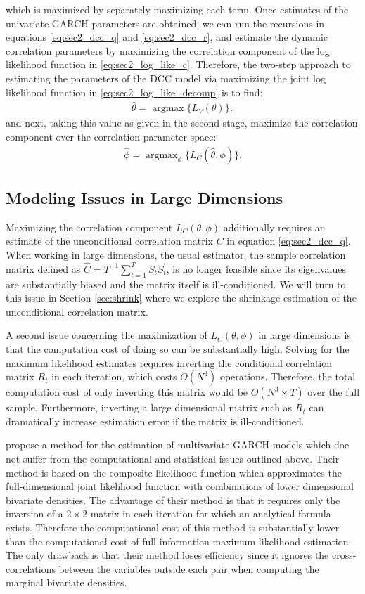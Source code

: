which is maximized by separately maximizing each term. Once estimates of the univariate GARCH parameters are obtained, we can run the recursions in equations \eqref{eq:sec2_dcc_q} and \eqref{eq:sec2_dcc_r}, and estimate the dynamic correlation parameters by maximizing the correlation component of the log likelihood function in \eqref{eq:sec2_log_like_c}. Therefore, the two-step approach to estimating the parameters of the DCC model via maximizing the joint log likelihood function in \eqref{eq:sec2_log_like_decomp} is to find:
\begin{align}
	\hat{\theta} = \operatorname{arg max}\{ L_V(\theta) \},
\end{align}
and next, taking this value as given in the second stage, maximize the correlation component over the correlation parameter space:
\begin{align}
	\hat{\phi} = \operatorname{arg max}_{\phi} \{ L_C(\hat{\theta}, \phi) \}.
\end{align}

\subsection{Modeling Issues in Large Dimensions}

Maximizing the correlation component $L_C(\theta, \phi)$ additionally requires an estimate of the unconditional correlation matrix $C$ in equation \eqref{eq:sec2_dcc_q}. When working in large dimensions, the usual estimator, the sample correlation matrix defined as $\hat{C} = T^{-1}\sum_{t=1}^T S_t S_t^\prime$, is no longer feasible since its eigenvalues are substantially biased and the matrix itself is ill-conditioned. We will turn to this issue in Section \ref{sec:shrink} where we explore the shrinkage estimation of the unconditional correlation matrix.

A second issue concerning the maximization of $L_C(\theta, \phi)$ in large dimensions is that the computation cost of doing so can be substantially high. Solving for the maximum likelihood estimates requires inverting the conditional correlation matrix $R_t$ in each iteration, which costs $O(N^3)$ operations. Therefore, the total computation cost of only inverting this matrix would be $O(N^3 \times T)$ over the full sample. Furthermore, inverting a large dimensional matrix such as $R_t$ can dramatically increase estimation error if the matrix is ill-conditioned. 

\textcite{PAKELETAL} propose a method for the estimation of multivariate GARCH models which doe not suffer from the computational and statistical issues outlined above. Their method is based on the composite likelihood function which approximates the full-dimensional joint likelihood function with combinations of lower dimensional bivariate densities. The advantage of their method is that it requires only the inversion of a $2 \times 2$ matrix in each iteration for which an analytical formula exists. Therefore the computational cost of this method is substantially lower than the computational cost of full information maximum likelihood estimation. The only drawback is that their method loses efficiency since it ignores the cross-correlations between the variables outside each pair when computing the marginal bivariate densities.
 
